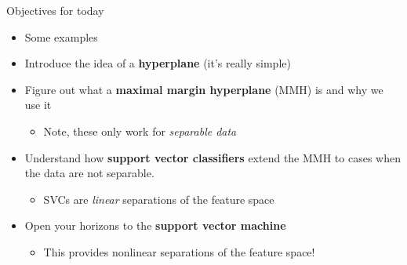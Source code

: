 \documentclass[mathserif, aspectratio=169]{beamer}
\begin{document}
\begin{frame}{Objectives for today}
\begin{itemize}
\item Some examples
\item Introduce the idea of a \textbf{hyperplane} (it's really simple)
\item Figure out what a \textbf{maximal margin hyperplane} (MMH) is and why we use it
\begin{itemize}
\item Note, these only work for \textit{separable data}
\end{itemize}
\item Understand how \textbf{support vector classifiers} extend the MMH to cases when the data are not separable.  
\begin{itemize}
\item SVCs are \textit{linear} separations of the feature space
\end{itemize}
\item Open your horizons to the \textbf{support vector machine}
\begin{itemize}
\item This provides nonlinear separations of the feature space!
\end{itemize}
\end{itemize}

\end{frame}
\end{document}
